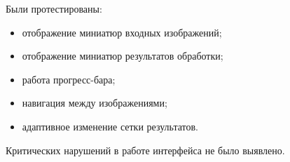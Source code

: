 Были протестированы:
\begin{itemize}
	\item отображение миниатюр входных изображений;
	\item отображение миниатюр результатов обработки;
	\item работа прогресс-бара;
	\item навигация между изображениями;
	\item адаптивное изменение сетки результатов.
\end{itemize}

Критических нарушений в работе интерфейса не было выявлено.











